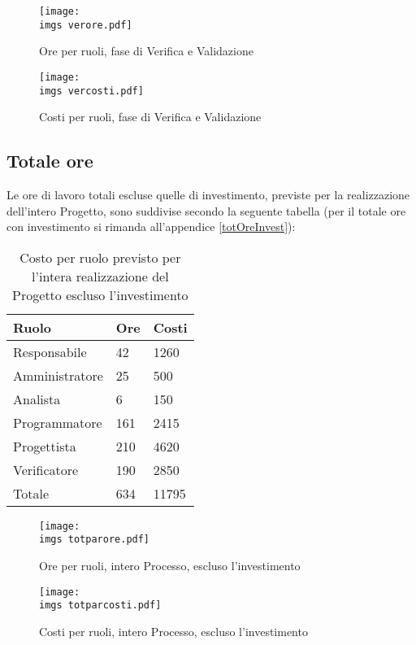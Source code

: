 {{	\begin{figure}[H]
		\centering
		\texttt{[image: \\imgs verore.pdf]}
		\label{fig:oreverifica}
		\caption{Ore per ruoli, fase di Verifica e Validazione}
	\end{figure}
	\begin{figure}[H]
		\centering
		\texttt{[image: \\imgs vercosti.pdf]}
		\label{fig:costoverifica}
		\caption{Costi per ruoli, fase di Verifica e Validazione}
	\end{figure}
}
\subsection{Totale ore}{
		Le ore di lavoro totali escluse quelle di investimento, previste per la realizzazione dell’intero Progetto, sono suddivise secondo la seguente tabella (per il totale ore con investimento si rimanda all'appendice \ref{totOreInvest}):
		\begin{table}[H]
			 \centering
			 \begin{tabular}{p{}p{}
				  		  				p{}}
				  \toprule Ruolo & Ore  & Costi \\
				  \midrule
				  Responsabile & 42  & 1260 \\
				  Amministratore & 25  & 500 \\
				  Analista & 6   & 150 \\
				  Programmatore & 161  & 2415 \\
				  Progettista & 210  & 4620 \\
				  Verificatore & 190  & 2850 \\
				  \hline
				  Totale & 634  & 11795 \\
				  \bottomrule
			 \end{tabular}
			 \label{tab:costonoinvestimento}
			 \caption{Costo per ruolo previsto per l’intera realizzazione del Progetto escluso l’investimento}
		\end{table}
		
		\begin{figure}[H]
			\centering
			\texttt{[image: \\imgs totparore.pdf]}
			\label{fig:orenoinvestimento}
			\caption{Ore per ruoli, intero Processo, escluso l’investimento}
		\end{figure}
		\begin{figure}[H]
			\centering
			\texttt{[image: \\imgs totparcosti.pdf]}
			\label{fig:costonoinvestimento}
			\caption{Costi per ruoli, intero Processo, escluso l’investimento}
		\end{figure}
}
}